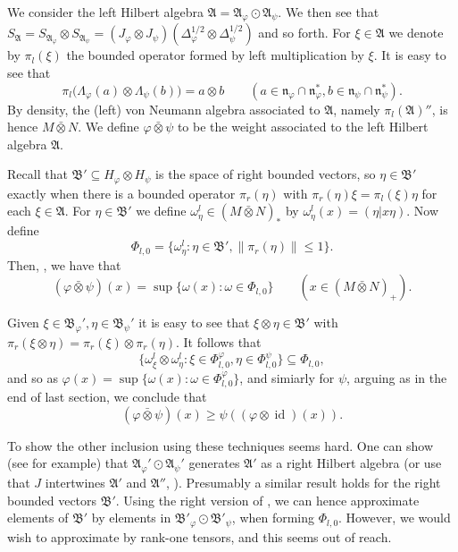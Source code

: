 \documentclass[a4paper,11pt]{article}
\theoremstyle{plain}
\theoremstyle{remark}
\newcommand{\mf}[1]{\mathfrak{#1}}
\newcommand{\id}{\operatorname{id}}
\newcommand{\vnten}{\bar\otimes}
\begin{document}
We consider the left Hilbert algebra $\mf A = \mf A_\varphi \odot \mf A_\psi$.  We then see that $S_{\mf A} = S_{\mf A_\varphi} \otimes S_{\mf A_\psi} = (J_\varphi\otimes J_\psi) (\Delta_\varphi^{1/2} \otimes \Delta_\psi^{1/2})$ and so forth.  For $\xi\in\mf A$ we denote by $\pi_l(\xi)$ the bounded operator formed by left multiplication by $\xi$.  It is easy to see that
\[ \pi_l\big( \Lambda_\varphi(a) \otimes \Lambda_\psi(b) \big) = a\otimes b \qquad
(a\in\mf n_\varphi \cap \mf n_\varphi^*, b\in\mf n_\psi \cap \mf n_\psi^*). \]
By density, the (left) von Neumann algebra associated to $\mf A$, namely $\pi_l(\mf A)''$, is hence $M\vnten N$.  We define $\varphi\vnten\psi$ to be the weight associated to the left Hilbert algebra $\mf A$.

Recall that $\mf B' \subseteq H_\varphi \otimes H_\psi$ is the space of right bounded vectors, so $\eta\in\mf B'$ exactly when there is a bounded operator $\pi_r(\eta)$ with $\pi_r(\eta)\xi = \pi_l(\xi)\eta$ for each $\xi\in \mf A$.  For $\eta\in\mf B'$ we define $\omega^l_\eta \in (M\vnten N)_*$ by $\omega^l_\eta(x) = (\eta|x\eta)$.  Now define
\[ \Phi_{l,0} = \big\{ \omega^l_\eta : \eta\in\mf B', \|\pi_r(\eta)\|\leq 1 \big\}. \]
Then, \cite[Lemma~VII.2.4]{TakesakiII}, we have that
\[ (\varphi\vnten\psi)(x) = \sup\{ \omega(x) : \omega\in \Phi_{l,0} \} \qquad (x\in (M\vnten N)_+). \]

Given $\xi\in\mf B_\varphi', \eta\in\mf B_\psi'$ it is easy to see that $\xi\otimes\eta\in \mf B'$ with $\pi_r(\xi\otimes\eta) = \pi_r(\xi)\otimes\pi_r(\eta)$.  It follows that
\[ \{ \omega^l_\xi \otimes \omega^l_\eta : \xi\in \Phi^\varphi_{l,0}, \eta\in\Phi^\psi_{l,0} \} \subseteq \Phi_{l,0}, \]
and so as $\varphi(x) = \sup\{ \omega(x) : \omega\in \Phi^\varphi_{l,0}\}$, and simiarly for $\psi$, arguing as in the end of last section, we conclude that
\[ (\varphi\vnten\psi)(x) \geq \psi((\varphi\otimes\id)(x)). \]

To show the other inclusion using these techniques seems hard.  One can show (see \cite[(7), Section~8]{Stratila_ModTheoryBook} for example) that $\mf A_\varphi' \odot \mf A_\psi'$ generates $\mf A'$ as a right Hilbert algebra (or use that $J$ intertwines $\mf A'$ and $\mf A''$, \cite[Theorem~VI.1.19(ii)]{TakesakiII}).  Presumably a similar result holds for the right bounded vectors $\mf B'$.  Using the right version of \cite[Theorem~VI.1.26(ii)]{TakesakiII}, we can hence approximate elements of $\mf B'$ by elements in $\mf B'_\varphi \odot \mf B'_\psi$, when forming $\Phi_{l,0}$.  However, we would wish to approximate by rank-one tensors, and this seems out of reach.
\end{document}
